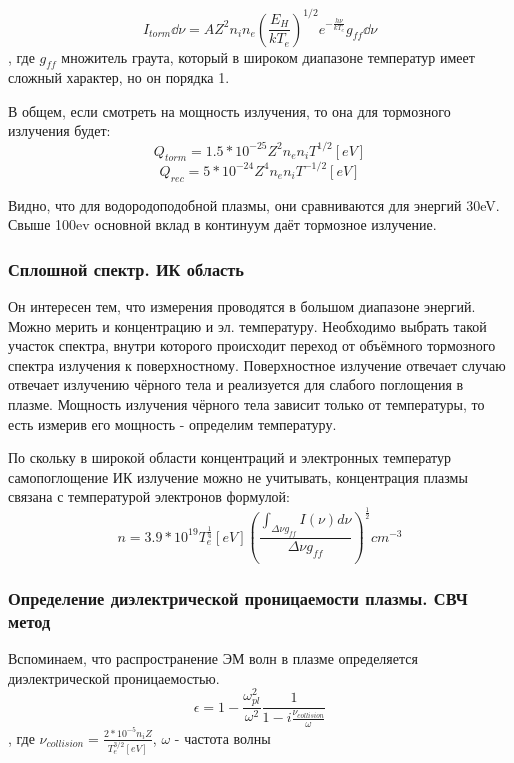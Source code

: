 \documentclass[10pt, a4paper]{article}
\begin{document}
\begin{equation}
	I_{torm} \dd\nu = A Z^{2} n_i n_e (\frac{E_H}{kT_e})^{1/2} e^{-\frac{h \nu}{kT_e}} g_{ff} \dd\nu
\end{equation}
, где $g_{ff}$ множитель граута, который в широком диапазоне температур имеет сложный характер, но он порядка 1.

В общем, если смотреть на мощность излучения, то она для тормозного излучения будет:
\begin{equation}
	Q_{torm}=1.5 *10^{-25} Z^{2} n_e n_i T^{1/2}[eV]
\end{equation}
\begin{equation}
	Q_{rec}=5 *10^{-24} Z^{4} n_e n_i T^{-1/2}[eV]
\end{equation}

Видно, что для водородоподобной плазмы, они сравниваются для энергий 30eV. Свыше 100ev основной вклад в континуум даёт тормозное излучение.

\subsubsection{Сплошной спектр. ИК область}

Он интересен тем, что измерения проводятся в большом диапазоне энергий. Можно мерить и концентрацию и эл. температуру.
Необходимо выбрать такой участок спектра, внутри которого происходит переход от объёмного тормозного спектра излучения к поверхностному.
Поверхностное излучение отвечает случаю отвечает излучению чёрного тела и реализуется для слабого поглощения в плазме. Мощность излучения чёрного тела зависит только от температуры, то есть измерив его мощность - определим температуру.

По скольку в широкой области концентраций и электронных температур самопоглощение ИК излучение можно не учитывать, концентрация плазмы связана с температурой электронов формулой:
\begin{equation}
	n=3.9*10^{19} T_e^{\frac{1}{4}}[eV] (\frac{\int_{\Delta \nu g_{ff}} I(\nu) d\nu}{\Delta \nu g_{ff}})^{\frac{1}{2}}   cm^{-3}
\end{equation}

\subsubsection{Определение диэлектрической проницаемости плазмы. СВЧ метод}

Вспоминаем, что распространение ЭМ волн в плазме определяется диэлектрической проницаемостью.
\begin{equation}
	\epsilon = 1- \frac{\omega_{pl}^{2}}{\omega^{2}} \frac{1}{1-i \frac{\nu_{collision}}{\omega}}
\end{equation} 
, где $\nu_{collision}=\frac{2*10^{-5} n_i Z}{T_e^{3/2}[eV]}$, $\omega$ - частота волны
\end{document}
